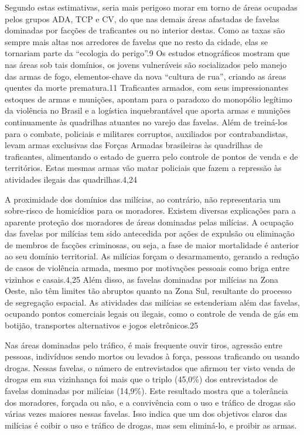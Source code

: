 \documentclass{article}
\begin{document}
Segundo estas estimativas, seria mais perigoso morar em torno de áreas ocupadas
pelos grupos ADA, TCP e CV, do que nas demais áreas afastadas de favelas
dominadas por facções de traficantes ou no interior destas. Como as taxas são
sempre mais altas nos arredores de favelas que no resto da cidade, elas se
tornariam parte da “ecologia do perigo”.9 Os estudos etnográficos mostram que
nas áreas sob tais domínios, os jovens vulneráveis são socializados pelo manejo
das armas de fogo, elementos-chave da nova “cultura de rua”, criando as áreas
quentes da morte prematura.11 Traficantes armados, com seus impressionantes
estoques de armas e munições, apontam para o paradoxo do monopólio legítimo da
violência no Brasil e a logística inquebrantável que aporta armas e munições
continuamente às quadrilhas atuantes no varejo das favelas. Além de treiná-los
para o combate, policiais e militares corruptos, auxiliados por contrabandistas,
levam armas exclusivas das Forças Armadas brasileiras às quadrilhas de
traficantes, alimentando o estado de guerra pelo controle de pontos de venda e
de territórios. Estas mesmas armas vão matar policiais que fazem a repressão às
atividades ilegais das quadrilhas.4,24

A proximidade dos domínios das milícias, ao contrário, não representaria um
sobre-risco de homicídios para os moradores. Existem diversas explicações para a
aparente proteção dos moradores de áreas dominadas pelas milícias. A ocupação
das favelas por milícias tem sido antecedida por ações de expulsão ou eliminação
de membros de facções criminosas, ou seja, a fase de maior mortalidade é
anterior ao seu domínio territorial. As milícias forçam o desarmamento, gerando
a redução de casos de violência armada, mesmo por motivações pessoais como briga
entre vizinhos e casais.4,25 Além disso, as favelas dominadas por milícias na
Zona Oeste, não têm limites tão abruptos quanto na Zona Sul, resultante do
processo de segregação espacial. As atividades das milícias se estenderiam além
das favelas, ocupando pontos comerciais legais ou ilegais, como o controle de
venda de gás em botijão, transportes alternativos e jogos eletrônicos.25

Nas áreas dominadas pelo tráfico, é mais frequente ouvir tiros, agressão entre
pessoas, indivíduos sendo mortos ou levados à força, pessoas traficando ou
usando drogas. Nessas favelas, o número de entrevistados que afirmou ter visto
venda de drogas em sua vizinhança foi mais que o triplo (45,0\%) dos
entrevistados de favelas dominadas por milícias (14,9\%). Este resultado mostra
que a tolerância dos moradores, forçada ou não, e a convivência com o uso e
tráfico de drogas são várias vezes maiores nessas favelas. Isso indica que um
dos objetivos claros das milícias é coibir o uso e tráfico de drogas, mas sem
eliminá-lo, e proibir as armas.
\end{document}

